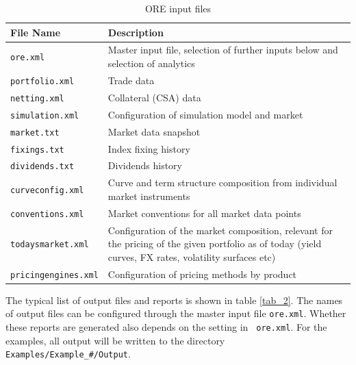 \documentclass[12pt, a4paper]{article}
\begin{document}
{\begin{table}[h]
\scriptsize
\begin{center}
\begin{tabular}{|l|p{11cm}|}
  \hline
  File Name & Description \\
  \hline
  {\tt ore.xml}&   Master input file, selection of further inputs below and selection of analytics \\
  {\tt portfolio.xml} & Trade data \\
  {\tt netting.xml} &  Collateral (CSA) data \\
  {\tt simulation.xml} & Configuration of simulation model and market\\
  {\tt market.txt} &  Market data snapshot \\
  {\tt fixings.txt} &  Index fixing history \\
  {\tt dividends.txt} &  Dividends history \\
  {\tt curveconfig.xml} & Curve and term structure composition from individual market instruments\\
  {\tt conventions.xml} & Market conventions for all market data points\\
  {\tt todaysmarket.xml} &  Configuration of the market composition, relevant for the pricing of the given portfolio as
                           of today (yield curves, FX rates, volatility surfaces etc) \\
  {\tt pricingengines.xml} &  Configuration of pricing methods by product\\
  \hline
\end{tabular}
\end{center}
\caption{ORE input files}
\label{tab_1}
\end{table}

The typical list of output files and reports is shown in table \ref{tab_2}. The names of output files can be configured
through the master input file {\tt ore.xml}. Whether these reports are generated also depends on the setting in {\tt
  ore.xml}. For the examples, all output will be written to the directory {\tt Examples/Example\_\#/Output}.

}
\end{document}
